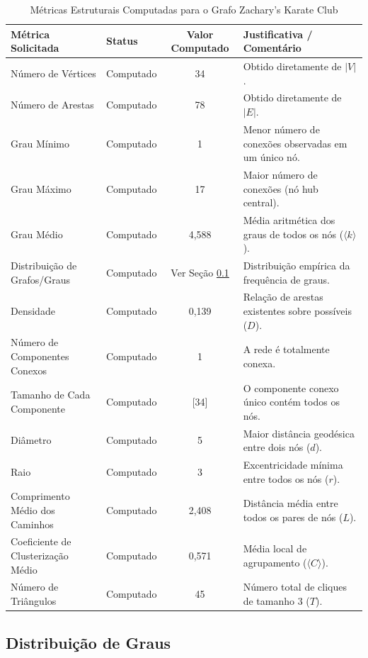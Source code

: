 \documentclass[sigconf]{webmedia}
\begin{document}
\begin{table}[t]
  \caption{Métricas Estruturais Computadas para o Grafo Zachary's Karate Club}
  \label{tab:metrics}
  \begin{tabular}{llcl}
    \toprule
    Métrica Solicitada & Status & Valor Computado & Justificativa / Comentário \\
    \midrule
    Número de Vértices & Computado & 34 & Obtido diretamente de $|V|$. \\
    Número de Arestas & Computado & 78 & Obtido diretamente de $|E|$. \\
    Grau Mínimo & Computado & 1 & Menor número de conexões observadas em um único nó. \\
    Grau Máximo & Computado & 17 & Maior número de conexões (nó hub central). \\
    Grau Médio & Computado & 4,588 & Média aritmética dos graus de todos os nós ($\langle k \rangle$). \\
    Distribuição de Grafos/Graus & Computado & Ver Seção \ref{sec:degree_dist} & Distribuição empírica da frequência de graus. \\
    Densidade & Computado & 0,139 & Relação de arestas existentes sobre possíveis ($D$). \\
    Número de Componentes Conexos & Computado & 1 & A rede é totalmente conexa. \\
    Tamanho de Cada Componente & Computado & [34] & O componente conexo único contém todos os nós. \\
    Diâmetro & Computado & 5 & Maior distância geodésica entre dois nós ($d$). \\
    Raio & Computado & 3 & Excentricidade mínima entre todos os nós ($r$). \\
    Comprimento Médio dos Caminhos & Computado & 2,408 & Distância média entre todos os pares de nós ($L$). \\
    Coeficiente de Clusterização Médio & Computado & 0,571 & Média local de agrupamento ($\langle C \rangle$). \\
    Número de Triângulos & Computado & 45 & Número total de cliques de tamanho 3 ($T$). \\
    \bottomrule
  \end{tabular}
\end{table}

\subsection{Distribuição de Graus}
\label{sec:degree_dist}
\end{document}
